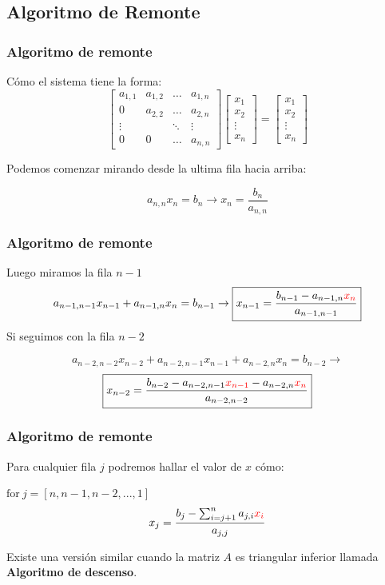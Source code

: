 \documentclass[xcolor=svgnames]{beamer} %
\theoremstyle{plain}
\renewcommand{\textbf}[1]{{\bfseries\textcolor{redUnq2}{#1}}}
\theoremstyle{definition}
\begin{document}
\subsection{Algoritmo de Remonte}

\begin{frame}
\frametitle{Algoritmo de remonte}

Cómo el sistema tiene la forma:
$$ \begin{bmatrix}
a_{1,1} & a_{1,2} 	& \dots 	 	& a_{1,n} \\
0       & a_{2,2} 	& \dots	 	& a_{2,n} \\
\vdots 	& 		  	& \ddots	 	& \vdots \\
0 		& 0			& \dots 		& a_{n,n}
\end{bmatrix} \begin{bmatrix}
x_1\\
x_2\\
\vdots\\
x_n
\end{bmatrix} =\begin{bmatrix}
x_1\\
x_2\\
\vdots\\
x_n
\end{bmatrix}$$

Podemos comenzar mirando desde la ultima fila hacia arriba:

$$ a_{n,n} x_n = b_n \rightarrow \boxed{x_n = \frac{b_n}{a_{n,n}}}$$ 

\end{frame}



\begin{frame}
\frametitle{Algoritmo de remonte}
Luego miramos la fila $n-1$
$$a_{n-1,n-1} x_{n-1} +a_{n-1,n} x_n = b_{n-1} \rightarrow
\boxed{ x_{n-1} = \frac{b_{n-1} - a_{n-1,n} {\color{red}x_n}}{a_{n-1,n-1}} }$$
Si seguimos con la fila $n-2$

$$a_{n-2,n-2} x_{n-2} +a_{n-2,n-1} x_{n-1} +a_{n-2,n} x_{n} = b_{n-2} \rightarrow$$
$$\boxed{x_{n-2} = \frac{b_{n-2} -a_{n-2,n-1} {\color{red}x_{n-1}} - a_{n-2,n} {\color{red}x_n} } {a_{n-2,n-2}}   } $$
\end{frame}

\begin{frame}
\frametitle{Algoritmo de remonte}
 Para cualquier fila $j$ podremos hallar el valor de $x$ cómo:
 
$ \text{for} \ j = [n,n-1,n-2,...,1]$
 $$ x_j = \frac{ b_j - \sum_{i=j+1}^{n} a_{j,i} {\color{red}x_i}}{ a_{j,j} }$$


Existe una versión similar cuando la matriz $A$ es triangular inferior llamada
\textbf{Algoritmo de descenso}.
\end{frame}
\end{document}
